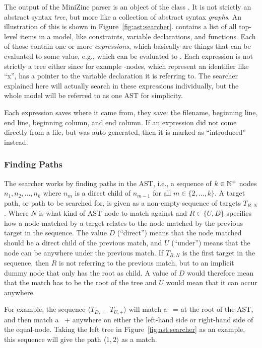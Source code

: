 \documentclass[a4paper,12pt]{article}
\begin{document}
The output of the MiniZinc parser is an object of the class . It is not strictly
an abstract syntax \emph{tree}, but more like a collection of abstract syntax
\emph{graphs}. An illustration of this is shown in Figure~\ref{fig:ast:searcher}.
 contains a list of all top-level items in a model, like constraints, variable
declarations, and functions. Each of those contain one or more \emph{expressions}, which
basically are things that can be evaluated to some value, e.g.,  which can be
evaluated to . Each expression is not strictly a tree either since for example
-nodes, which represent an identifier like ``x'', has a pointer to the variable
declaration it is referring to. The searcher explained here will actually search in these
expressions individually, but the whole model will be referred to as one AST for
simplicity.

Each expression saves where it came from, they save: the filename, beginning line, end
line, beginning column, and end column. If an expression did not come directly from a file,
but was auto generated, then it is marked as ``introduced'' instead.

\subsubsection{Finding Paths}\label{sec:paths}
The searcher works by finding paths in the AST, i.e., a sequence of $k \in \mathbb{N}^+$
nodes $n_1, n_2, \dots ,n_k$ where $n_m$ is a direct child of $n_{m-1}$ for
all $m \in \{2,\dots,k\}$. A target path, or path to be searched for, is given as a
non-empty sequence of targets $T_{R,N}$. Where $N$ is what kind of AST node to match
against and $R \in \{U,D\}$ specifies how a node matched by a target relates to the node
matched by the previous target in the sequence. The value $D$ (``direct'') means that the
node matched should be a direct child of the previous match, and $U$ (``under'') means
that the node can be anywhere under the previous match. If $T_{R,N}$ is the first target
in the sequence, then $R$ is not referring to the previous match, but to an implicit dummy node
that only has the root as child.
A value of $D$ would therefore mean that the match has to be the root of the tree and $U$ would mean
that it can occur anywhere.

For example, the sequence $\langle T_{D,=} \; T_{U,+} \rangle$ will match a ~=
at the root of the AST, and then match a ~+ anywhere on either the left-hand
side or right-hand side of the equal-node. Taking the left tree in
Figure~\ref{fig:ast:searcher} as an example, this sequence will give the path
$\langle 1,2 \rangle$ as a match.
\end{document}
